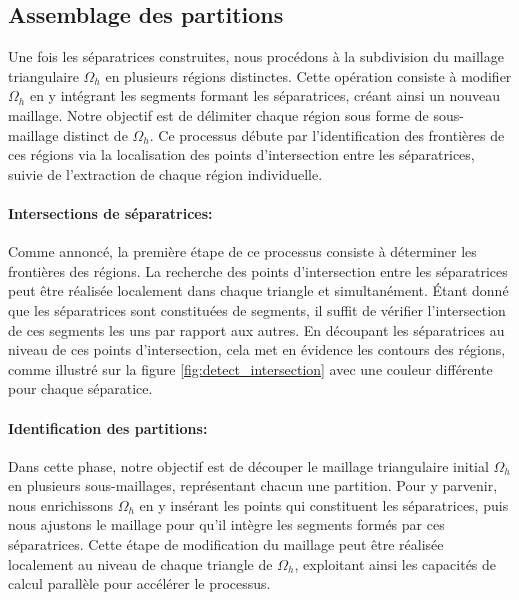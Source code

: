 \subsection{Assemblage des partitions}

Une fois les séparatrices construites, nous procédons à la subdivision du maillage triangulaire $\Omega_h$ en plusieurs régions distinctes. Cette opération consiste à modifier $\Omega_h$ en y intégrant les segments formant les séparatrices, créant ainsi un nouveau maillage. Notre objectif est de délimiter chaque région sous forme de sous-maillage distinct de $\Omega_h$. Ce processus débute par l'identification des frontières de ces régions via la localisation des points d'intersection entre les séparatrices, suivie de l'extraction de chaque région individuelle.

\paragraph{Intersections de séparatrices:}

Comme annoncé, la première étape de ce processus consiste à déterminer les frontières des régions. La recherche des points d'intersection entre les séparatrices peut être réalisée localement dans chaque triangle et simultanément. Étant donné que les séparatrices sont constituées de segments, il suffit de vérifier l'intersection de ces segments les uns par rapport aux autres. En découpant les séparatrices au niveau de ces points d'intersection, cela met en évidence les contours des régions, comme illustré sur la figure \ref{fig:detect_intersection} avec une couleur différente pour chaque séparatice.

\paragraph{Identification des partitions:}
Dans cette phase, notre objectif est de découper le maillage triangulaire initial $\Omega_h$ en plusieurs sous-maillages, représentant chacun une partition. Pour y parvenir, nous enrichissons $\Omega_h$ en y insérant les points qui constituent les séparatrices, puis nous ajustons le maillage pour qu'il intègre les segments formés par ces séparatrices. Cette étape de modification du maillage peut être réalisée localement au niveau de chaque triangle de $\Omega_h$, exploitant ainsi les capacités de calcul parallèle pour accélérer le processus.

